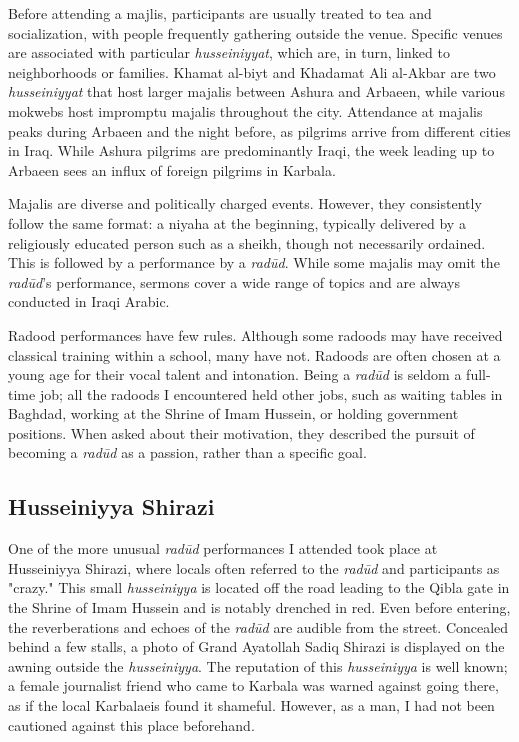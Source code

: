 Before attending a majlis, participants are usually treated to tea and socialization, with people frequently gathering outside the venue. Specific venues are associated with particular \emph{husseiniyyat}, which are, in turn, linked to neighborhoods or families. Khamat al-biyt and Khadamat Ali al-Akbar are two \emph{husseiniyyat} that host larger majalis between Ashura and Arbaeen, while various mokwebs host impromptu majalis throughout the city. Attendance at majalis peaks during Arbaeen and the night before, as pilgrims arrive from different cities in Iraq. While Ashura pilgrims are predominantly Iraqi, the week leading up to Arbaeen sees an influx of foreign pilgrims in Karbala.

Majalis are diverse and politically charged events. However, they consistently follow the same format: a niyaha at the beginning, typically delivered by a religiously educated person such as a sheikh, though not necessarily ordained. This is followed by a performance by a \emph{radūd}. While some majalis may omit the \emph{radūd}'s performance, sermons cover a wide range of topics and are always conducted in Iraqi Arabic.

Radood performances have few rules. Although some radoods may have received classical training within a school, many have not. Radoods are often chosen at a young age for their vocal talent and intonation. Being a \emph{radūd} is seldom a full-time job; all the radoods I encountered held other jobs, such as waiting tables in Baghdad, working at the Shrine of Imam Hussein, or holding government positions. When asked about their motivation, they described the pursuit of becoming a \emph{radūd} as a passion, rather than a specific goal.

\subsection{Husseiniyya Shirazi}
One of the more unusual \emph{radūd} performances I attended took place at Husseiniyya Shirazi, where locals often referred to the \emph{radūd} and participants as "crazy." This small \emph{husseiniyya} is located off the road leading to the Qibla gate in the Shrine of Imam Hussein and is notably drenched in red. Even before entering, the reverberations and echoes of the \emph{radūd} are audible from the street. Concealed behind a few stalls, a photo of Grand Ayatollah Sadiq Shirazi is displayed on the awning outside the \emph{husseiniyya}. The reputation of this \emph{husseiniyya} is well known; a female journalist friend who came to Karbala was warned against going there, as if the local Karbalaeis found it shameful. However, as a man, I had not been cautioned against this place beforehand.

